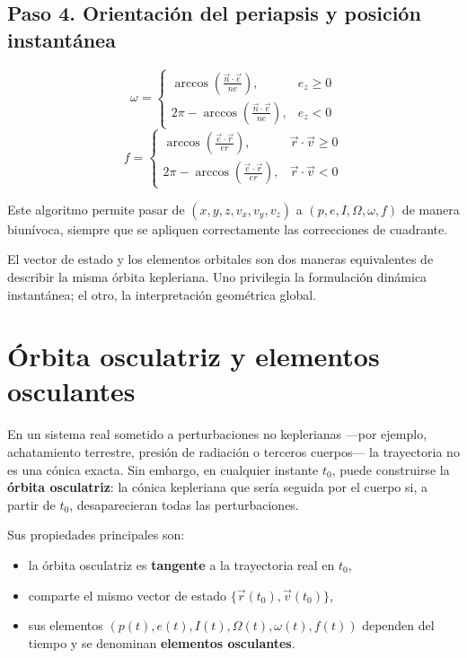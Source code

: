 \subsection{Paso 4. Orientación del periapsis y posición instantánea}
\[
\omega =
\begin{cases}
\arccos\left(\frac{\vec{n}\cdot\vec{e}}{ne}\right), & e_z \ge 0 \\
2\pi - \arccos\left(\frac{\vec{n}\cdot\vec{e}}{ne}\right), & e_z < 0
\end{cases}
\]
\[
 f =
\begin{cases}
\arccos\left(\frac{\vec{e}\cdot\vec{r}}{er}\right), & \vec{r}\cdot\vec{v} \ge 0 \\
2\pi - \arccos\left(\frac{\vec{e}\cdot\vec{r}}{er}\right), & \vec{r}\cdot\vec{v} < 0
\end{cases}
\]

Este algoritmo permite pasar de \((x,y,z,v_x,v_y,v_z)\) a \((p,e,I,\Omega,\omega,f)\) de manera biunívoca, siempre que se apliquen correctamente las correcciones de cuadrante.

\begin{importante}
El vector de estado y los elementos orbitales son dos maneras equivalentes de describir la misma órbita kepleriana. Uno privilegia la formulación dinámica instantánea; el otro, la interpretación geométrica global.
\end{importante}

\section{Órbita osculatriz y elementos osculantes}
En un sistema real sometido a perturbaciones no keplerianas —por ejemplo, achatamiento terrestre, presión de radiación o terceros cuerpos— la trayectoria no es una cónica exacta. Sin embargo, en cualquier instante \(t_0\), puede construirse la \textbf{órbita osculatriz}: la cónica kepleriana que sería seguida por el cuerpo si, a partir de \(t_0\), desaparecieran todas las perturbaciones.

Sus propiedades principales son:
\begin{itemize}
    \item la órbita osculatriz es \textbf{tangente} a la trayectoria real en \(t_0\),
    \item comparte el mismo vector de estado \(\{\vec{r}(t_0),\vec{v}(t_0)\}\),
    \item sus elementos \((p(t), e(t), I(t), \Omega(t), \omega(t), f(t))\) dependen del tiempo y se denominan \textbf{elementos osculantes}.
\end{itemize}


